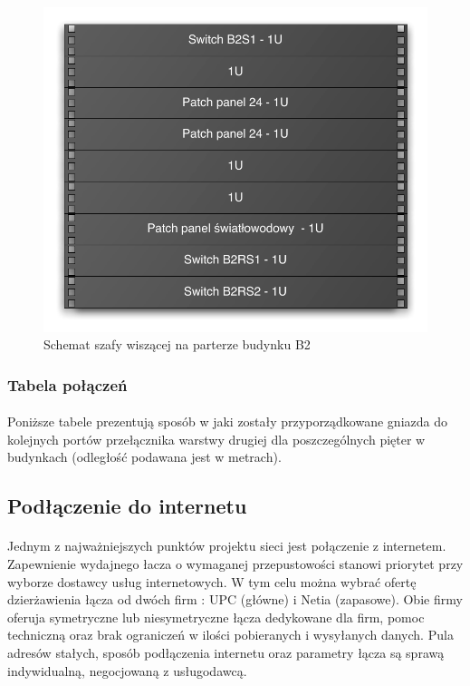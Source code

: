 \begin{figure}[H]
  \begin{center}
    \includegraphics[width=\textwidth]{img/s/szafa-b2.pdf}
    \caption{Schemat szafy wiszącej na parterze budynku B2}
  \end{center}
\end{figure}


\subsubsection{Tabela połączeń}
\paragraph{}
Poniższe tabele prezentują sposób w jaki zostały przyporządkowane gniazda do kolejnych portów przełącznika warstwy drugiej dla poszczególnych pięter w budynkach (odległość podawana jest w metrach).


\subsection{Podłączenie do internetu}
\paragraph{}
Jednym z najważniejszych punktów projektu sieci jest połączenie z internetem. Zapewnienie wydajnego łacza o wymaganej przepustowości stanowi priorytet przy wyborze dostawcy usług internetowych. W tym celu można wybrać ofertę dzierżawienia łącza od dwóch firm : UPC (główne) i Netia (zapasowe). Obie firmy oferuja symetryczne lub niesymetryczne łącza dedykowane dla firm, pomoc techniczną oraz brak ograniczeń w ilości pobieranych i wysyłanych danych. Pula adresów stałych, sposób podłączenia internetu oraz parametry łącza są sprawą indywidualną, negocjowaną z usługodawcą.

